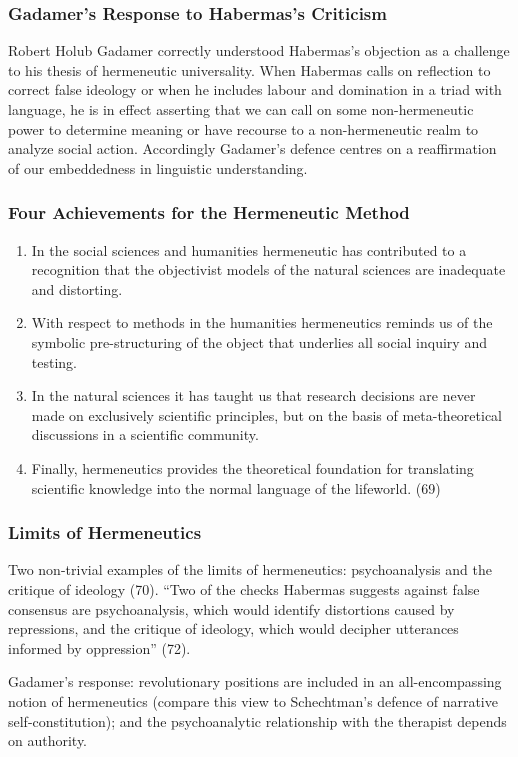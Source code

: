 \documentclass[xcolor=dvipsnames]{beamer}
\begin{document}
\begin{frame}
  \frametitle{Gadamer's Response to Habermas's Criticism}
  \begin{block}{Robert Holub}
    Gadamer correctly understood Habermas's objection as a challenge
    to his thesis of hermeneutic universality. When Habermas calls on
    reflection to correct false ideology or when he includes labour
    and domination in a triad with language, he is in effect asserting
    that we can call on some non-hermeneutic power to determine
    meaning or have recourse to a non-hermeneutic realm to analyze
    social action. Accordingly Gadamer's defence centres on a
    reaffirmation of our embeddedness in linguistic understanding.
  \end{block}
\end{frame}

\begin{frame}
  \frametitle{Four Achievements for the Hermeneutic Method}
  \begin{enumerate}
  \item In the social sciences and humanities hermeneutic has
    contributed to a recognition that the objectivist models of the
    natural sciences are inadequate and distorting.
  \item With respect to methods in the humanities hermeneutics reminds
    us of the symbolic pre-structuring of the object that underlies
    all social inquiry and testing. 
  \item In the natural sciences it has taught us that research
    decisions are never made on exclusively scientific principles, but
    on the basis of meta-theoretical discussions in a scientific
    community. 
  \item Finally, hermeneutics provides the theoretical foundation for
    translating scientific knowledge into the normal language of the
    lifeworld. (69)
  \end{enumerate}
\end{frame}

\begin{frame}
  \frametitle{Limits of Hermeneutics}
  Two non-trivial examples of the limits of hermeneutics:
  psychoanalysis and the critique of ideology (70). ``Two of the
  checks Habermas suggests against false consensus are psychoanalysis,
  which would identify distortions caused by repressions, and the
  critique of ideology, which would decipher utterances informed by
  oppression'' (72).

  \bigskip

  Gadamer's response: revolutionary positions are included in an
  all-encompassing notion of hermeneutics (compare this view to
  Schechtman's defence of narrative self-constitution); and the
  psychoanalytic relationship with the therapist depends on authority.
\end{frame}
\end{document}
